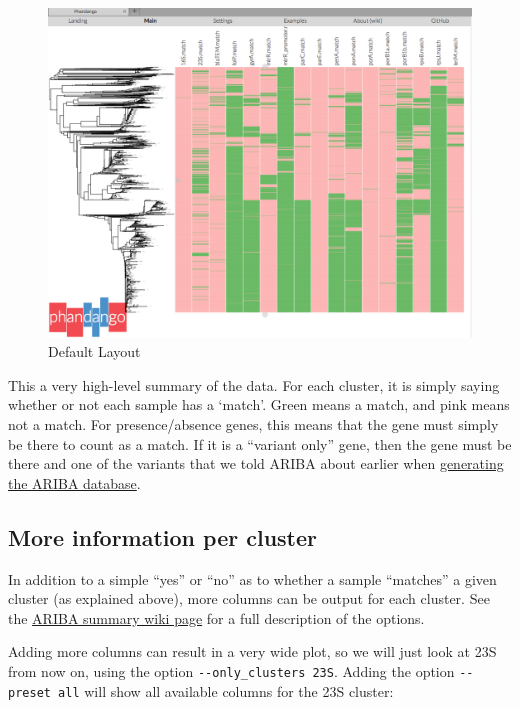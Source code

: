 \documentclass[11pt]{article}
\makeatletter
\def\maxwidth{\ifdim\Gin@nat@width>\linewidth\linewidth
    \else\Gin@nat@width\fi}
\let\Oldincludegraphics\includegraphics
\renewcommand{\includegraphics}[1]{\Oldincludegraphics[width=.8\maxwidth, height=.55\textheight, keepaspectratio]{#1}}
\makeatother
\begin{document}
    \begin{figure}[!h]
\centering
\includegraphics{Screenshots/screenshot.phandango.default.png}
\caption{Default Layout}
\end{figure}


\newpage




    This a very high-level summary of the data. For each cluster, it is
simply saying whether or not each sample has a `match'. Green means a
match, and pink means not a match. For presence/absence genes, this
means that the gene must simply be there to count as a match. If it is a
``variant only'' gene, then the gene must be there and one of the
variants that we told ARIBA about earlier when
\href{make_custom_db.ipynb}{generating the ARIBA database}.

    \hypertarget{more-information-per-cluster}{%
\subsection{More information per
cluster}\label{more-information-per-cluster}}

In addition to a simple ``yes'' or ``no'' as to whether a sample
``matches'' a given cluster (as explained above), more columns can be
output for each cluster. See the
\href{https://github.com/sanger-pathogens/ariba/wiki/Task:-summary}{ARIBA
summary wiki page} for a full description of the options.

Adding more columns can result in a very wide plot, so we will just look
at 23S from now on, using the option \texttt{-\/-only\_clusters\ 23S}.
Adding the option \texttt{-\/-preset\ all} will show all available
columns for the 23S cluster:
\end{document}
